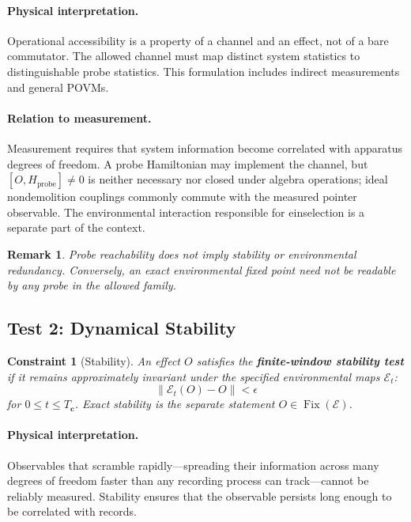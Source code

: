 \documentclass[12pt,a4paper,openany]{book}
\newtheorem{remark}[theorem]{Remark}
\newtheorem{constraint}[theorem]{Constraint}
\begin{document}
\paragraph{Physical interpretation.}
Operational accessibility is a property of a channel and an effect, not of a bare commutator.  The allowed channel must map distinct system statistics to distinguishable probe statistics.  This formulation includes indirect measurements and general POVMs.

\paragraph{Relation to measurement.}
Measurement requires that system information become correlated with apparatus degrees of freedom.  A probe Hamiltonian may implement the channel, but $[O,H_{\mathrm{probe}}]\ne0$ is neither necessary nor closed under algebra operations; ideal nondemolition couplings commonly commute with the measured pointer observable.  The environmental interaction responsible for einselection is a separate part of the context.

\begin{remark}
Probe reachability does not imply stability or environmental redundancy.  Conversely, an exact environmental fixed point need not be readable by any probe in the allowed family.
\end{remark}

\subsection{Test 2: Dynamical Stability}

\begin{constraint}[Stability]
\label{H-E-const:stability}
An effect $O$ satisfies the \textbf{finite-window stability test} if it remains approximately invariant under the specified environmental maps $\mathcal{E}_t$:
\begin{equation}
\|\mathcal{E}_t(O) - O\| < \epsilon
\end{equation}
for $0\le t\le T_{\mathbf c}$.  Exact stability is the separate statement $O\in\operatorname{Fix}(\mathcal E)$.
\end{constraint}

\paragraph{Physical interpretation.}
Observables that scramble rapidly---spreading their information across many degrees of freedom faster than any recording process can track---cannot be reliably measured. Stability ensures that the observable persists long enough to be correlated with records.
\end{document}
